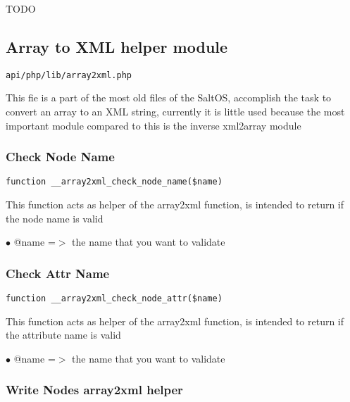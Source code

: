 \documentclass[a4paper]{article}
\begin{document}
TODO

\hypertarget{toc367}{}
\subsection{Array to XML helper module}

\begin{lstlisting}
api/php/lib/array2xml.php
\end{lstlisting}

This fie is a part of the most old files of the SaltOS, accomplish the task to convert an array
to an XML string, currently it is little used because the most important module compared to this
is the inverse xml2array module

\hypertarget{toc368}{}
\subsubsection{Check Node Name}

\begin{lstlisting}
function __array2xml_check_node_name($name)
\end{lstlisting}

This function acts as helper of the array2xml function, is intended to
return if the node name is valid

\begin{compactitem}
\item[\color{myblue}$\bullet$] @name =$>$ the name that you want to validate
\end{compactitem}

\hypertarget{toc369}{}
\subsubsection{Check Attr Name}

\begin{lstlisting}
function __array2xml_check_node_attr($name)
\end{lstlisting}

This function acts as helper of the array2xml function, is intended to
return if the attribute name is valid

\begin{compactitem}
\item[\color{myblue}$\bullet$] @name =$>$ the name that you want to validate
\end{compactitem}

\hypertarget{toc370}{}
\subsubsection{Write Nodes array2xml helper}
\end{document}
